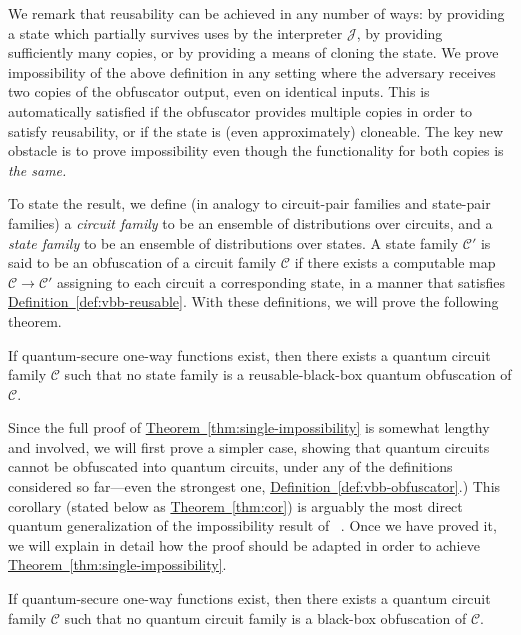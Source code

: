 \documentclass[envcountsame]{llncs}
\numberwithin{equation}{section}
\newcommand{\expref}[2]{\texorpdfstring{\hyperref[#2]{#1~\ref{#2}}}{#1~\ref{#2}}}
\newcommand{\algo}{\mathcal}
\begin{document}
We remark that reusability can be achieved in any number of ways: by providing a state which partially survives uses by the interpreter $\algo J$, by providing sufficiently many copies, or by providing a means of cloning the state. We prove impossibility of the above definition in any setting where the adversary receives two copies of the obfuscator output, even on identical inputs. This is automatically satisfied if the obfuscator provides multiple copies in order to satisfy reusability, or if the state is (even approximately) cloneable. The key new obstacle is to prove impossibility even though the functionality for both copies is \emph{the same.}

To state the result, we define (in analogy to circuit-pair families and state-pair families) a \emph{circuit family} to be an ensemble of distributions over circuits, and a \emph{state family} to be an ensemble of distributions over states. A state family $\mathcal C'$ is said to be an obfuscation of a circuit family $\mathcal C$ if there exists a computable map $\mathcal C \rightarrow \mathcal C'$ assigning to each circuit a corresponding state, in a manner that satisfies \expref{Definition}{def:vbb-reusable}. With these definitions, we will prove the following theorem.

\begin{theorem}\label{thm:single-impossibility}
If quantum-secure one-way functions exist, then there exists a quantum circuit family $\mathcal C$ such that no state family is a reusable-black-box quantum obfuscation of $\mathcal C$.
\end{theorem}

Since the full proof of \expref{Theorem}{thm:single-impossibility} is somewhat lengthy and involved, we will first prove a simpler case, showing that quantum circuits cannot be obfuscated into quantum circuits, under any of the definitions considered so far---even the strongest one, \expref{Definition}{def:vbb-obfuscator}.) This corollary (stated below as \expref{Theorem}{thm:cor}) is arguably the most direct quantum generalization of the impossibility result of ~\cite{BGIRSVY01}. Once we have proved it, we will explain in detail how the proof should be adapted in order to achieve \expref{Theorem}{thm:single-impossibility}.

\begin{theorem}\label{thm:cor}
If quantum-secure one-way functions exist, then there exists a quantum circuit family $\mathcal C$ such that no quantum circuit family is a black-box obfuscation of $\mathcal C$.
\end{theorem}
\end{document}
